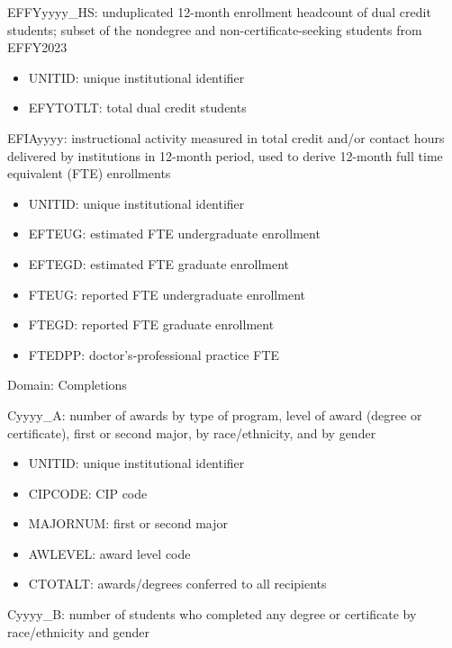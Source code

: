 \documentclass[sigconf, authorversion, nonacm]{acmart}
\begin{document}
        EFFYyyyy\_HS: unduplicated 12-month enrollment headcount of dual credit students; subset of the nondegree and non-certificate-seeking students from EFFY2023

        \begin{itemize}
            \item UNITID: unique institutional identifier
            \item EFYTOTLT: total dual credit students
        \end{itemize}

        EFIAyyyy: instructional activity measured in total credit and/or contact hours delivered by institutions in 12-month period, used to derive 12-month full time equivalent (FTE) enrollments

        \begin{itemize}
            \item UNITID: unique institutional identifier
            \item EFTEUG: estimated FTE undergraduate enrollment
            \item EFTEGD: estimated FTE graduate enrollment
            \item FTEUG: reported FTE undergraduate enrollment
            \item FTEGD: reported FTE graduate enrollment
            \item FTEDPP: doctor's-professional practice FTE
        \end{itemize}

        Domain: Completions

        Cyyyy\_A: number of awards by type of program, level of award (degree or certificate), first or second major, by race/ethnicity, and by gender

        \begin{itemize}
            \item UNITID: unique institutional identifier
            \item CIPCODE: CIP code
            \item MAJORNUM: first or second major
            \item AWLEVEL: award level code
            \item CTOTALT: awards/degrees conferred to all recipients
        \end{itemize}

        Cyyyy\_B: number of students who completed any degree or certificate by race/ethnicity and gender
\end{document}
